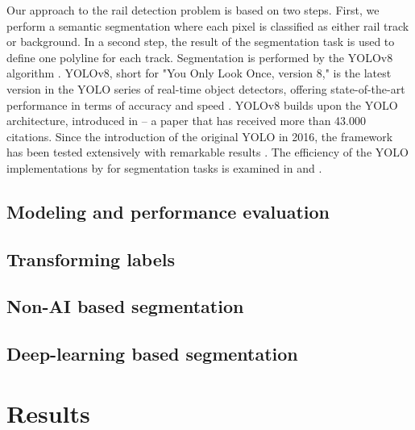 \documentclass[Master,MDS,english]{BASE/twbook} %
\begin{document}
Our approach to the rail detection problem is based on two steps. First, we perform a semantic segmentation where each pixel is classified as either rail track or background. In a second step, the result of the segmentation task is used to define one polyline for each track. Segmentation is performed by the YOLOv8 algorithm \citep{Jocher_Ultralytics_YOLO_2023}.  YOLOv8, short for "You Only Look Once, version 8," is the latest version in the YOLO series of real-time object detectors, offering state-of-the-art performance in terms of accuracy and speed \citep{ultralytics_docs}. YOLOv8 builds upon the YOLO architecture, introduced in \cite{redmon2016you} -- a paper that has received more than 43.000 citations. Since the introduction of the original YOLO in 2016, the framework has been tested extensively with remarkable results \citep{JIANG20221066, cryptography6020016, Diwan2023}. The efficiency of the YOLO implementations by \cite{Jocher_Ultralytics_YOLO_2023} for segmentation tasks is examined in \cite{agriculture13081643} and \cite{STRAKER2023100045}.






\section{Modeling and performance evaluation} 






\section{Transforming labels}









\section{Non-AI based segmentation}




\section{Deep-learning based segmentation}



\chapter{Results} %
\end{document}
